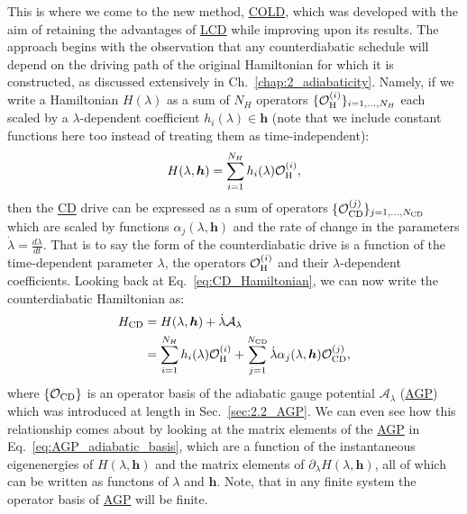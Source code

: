 \documentclass[a4paper,oneside,11pt]{book}
\newcommand{\hbb}{\boldsymbol{h}}
\newcommand{\dlambda}{\partial_{\lambda}}
\newcommand{\AGP}[1]{\mathcal{A}_{#1}}
\newcommand{\dotlambda}{\dot{\lambda}}
\newcommand{\acrref}[1]{\hyperref[acr:#1]{#1}}
\begin{document}
This is where we come to the new method, \acrref{COLD}, which was developed with the aim of retaining the advantages of \acrref{LCD} while improving upon its results. The approach begins with the observation that any counterdiabatic schedule will depend on the driving path of the original Hamiltonian for which it is constructed, as discussed extensively in Ch.~\ref{chap:2_adiabaticity}. Namely, if we write a Hamiltonian $H(\lambda)$ as a sum of $N_H$ operators $\{ \mathcal{O}_{\rm H}^{(i)} \}_{i = 1,...,N_H}$ each scaled by a $\lambda$-dependent coefficient $h_i(\lambda) \in \hbb$ (note that we include constant functions here too instead of treating them as time-independent):
\begin{equation}
    H(\lambda, \hbb) = \sum_{i = 1}^{N_H} h_i(\lambda) \mathcal{O}_{\rm H}^{(i)},
\end{equation}
then the \acrref{CD} drive can be expressed as a sum of operators $\{\mathcal{O}_{\rm CD}^{(j)}\}_{j = 1,...,N_{\rm CD}}$ which are scaled by functions $\alpha_{j}(\lambda, \hbb)$ and the rate of change in the parameters $\dotlambda = \frac{d \lambda}{dt}$. That is to say the form of the counterdiabatic drive is a function of the time-dependent parameter $\lambda$, the operators $\mathcal{O}_{\rm H}^{(i)}$ and their $\lambda$-dependent coefficients. Looking back at Eq.~\eqref{eq:CD_Hamiltonian}, we can now write the counterdiabatic Hamiltonian as:
\begin{equation}\label{eq:H_cd_operators}
    \begin{aligned}
        H_{\rm CD} &= H(\lambda, \hbb) + \dotlambda \AGP{\lambda} \\
        &= \sum_{i = 1}^{N_H} h_i(\lambda) \mathcal{O}_{\rm H}^{(i)} + \sum_{j = 1}^{N_{\rm CD}} \dotlambda \alpha_{j}(\lambda, \hbb) \mathcal{O}_{\rm CD}^{(j)},
    \end{aligned}
\end{equation}
where $\{\mathcal{O}_{\rm CD}\}$ is an operator basis of the adiabatic gauge potential $\AGP{\lambda}$ (\acrref{AGP}) which was introduced at length in Sec.~\ref{sec:2.2_AGP}. We can even see how this relationship comes about by looking at the matrix elements of the \acrref{AGP} in Eq.~\eqref{eq:AGP_adiabatic_basis}, which are a function of the instantaneous eigenenergies of $H(\lambda, \hbb)$ and the matrix elements of $\dlambda H(\lambda, \hbb)$, all of which can be written as functons of $\lambda$ and $\hbb$. Note, that in any finite system the operator basis of \acrref{AGP} will be finite.
\end{document}
